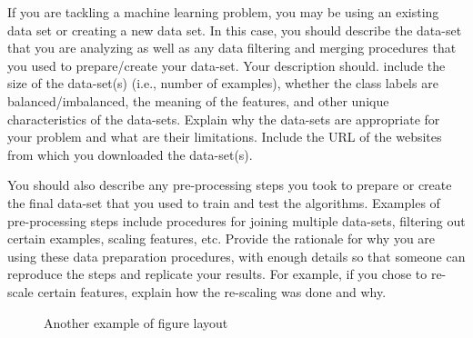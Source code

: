 \documentclass[letterpaper]{article} %
\begin{document}
If you are tackling a machine learning problem, you may be using an existing data set or creating a new data set.  In this case, you should describe the data-set that you are analyzing as well as any data filtering and merging procedures that you used to prepare/create your data-set.  Your description should. include the size of the data-set(s) (i.e., number of examples), whether the class labels are balanced/imbalanced, the meaning of the features, and other unique characteristics of the data-sets.   Explain why the data-sets are appropriate for your problem and what are their limitations.  Include the URL of the websites from which you downloaded the data-set(s).

You should also describe any pre-processing steps you took to prepare or create the final data-set that you used to train and test the algorithms.  Examples of pre-processing steps include procedures for joining multiple data-sets, filtering out certain examples, scaling features, etc.  Provide the rationale for why you are using these data preparation procedures, with enough details so that someone can reproduce the steps and replicate your results.   For example, if you chose to re-scale certain features, explain how the re-scaling was done and why.   



\begin{figure}[t!]
\centering
{}\hfill
{}\hfill
{}\hfill
{}\hfill
\caption{Another example of figure layout}
\label{fig:figures_across}
\end{figure}
\end{document}
